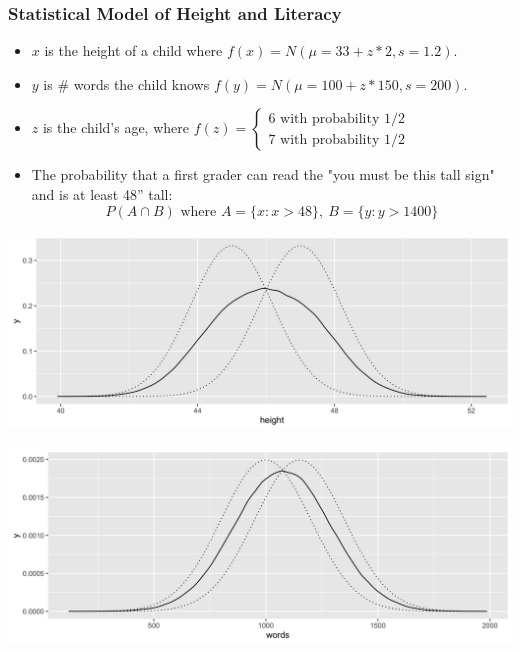 \documentclass[aspectratio=169, handout]{beamer}
\numberwithin{equation}{section}
\begin{document}
\begin{frame}
\frametitle{Statistical Model of Height and Literacy}
\begin{itemize}
\item $x$ is the height of a child where $f(x)=N(\mu=33+z*2, s= 1.2)$.\
\item $y$ is \# words the child knows $f(y)=N(\mu=100+z*150, s= 200)$.\pause 
\item $z$ is the child's age, where $f(z)=\begin{cases} 6\text{ with probability }1/2\\ 7\text{ with probability }1/2\end{cases}$
\item The probability that a first grader can read the "you must be this tall sign" and is at least 48'' tall:
$$P(A\cap B)\text{ where }A=\{x: x>48\}, \ B=\{y: y>1400\}$$
\end{itemize}
\end{frame}

\begin{frame}
\begin{center}
\includegraphics[width=5 in]{images/Heightdensity.png}
\end{center}
\end{frame}

\begin{frame}
\begin{center}
\includegraphics[width=5 in]{images/Wordsdensity.png}
\end{center}
\end{frame}
\end{document}
